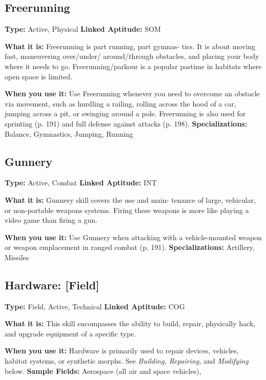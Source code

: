 \subsection{Freerunning}

\textbf{Type:} Active, Physical
\textbf{Linked Aptitude:} SOM

\textbf{What it is:} Freerunning is part running, part gymnas-
tics. It is about moving fast, maneuvering over/under/
around/through obstacles, and placing your body 
where it needs to go. Freerunning/parkour is a popular 
pastime in habitats where open space is limited.

\textbf{When you use it:} Use Freerunning whenever you 
need to overcome an obstacle via movement, such 
as hurdling a railing, rolling across the hood of a 
car, jumping across a pit, or swinging around a pole. 
Freerunning is also used for sprinting (p. 191) and full 
defense against attacks (p. 198).
\textbf{Specializations:} Balance, Gymnastics, Jumping, Running

\subsection{Gunnery}

\textbf{Type:} Active, Combat
\textbf{Linked Aptitude:} INT

\textbf{What it is:} Gunnery skill covers the use and main-
tenance of large, vehicular, or non-portable weapons 
systems. Firing these weapons is more like playing a 
video game than firing a gun.

\textbf{When you use it:} Use Gunnery when attacking with 
a vehicle-mounted weapon or weapon emplacement 
in ranged combat (p. 191).
\textbf{Specializations:} Artillery, Missiles

\subsection{Hardware: [Field]}

\textbf{Type:} Field, Active, Technical
\textbf{Linked Aptitude:} COG

\textbf{What it is:} This skill encompasses the ability to 
build, repair, physically hack, and upgrade equipment 
of a specific type.

\textbf{When you use it:} Hardware is primarily used to repair 
devices, vehicles, habitat systems, or synthetic morphs. 
See \textit{Building, Repairing,} and \textit{Modifying} below.
\textbf{Sample Fields:} Aerospace (all air and space vehicles), 

